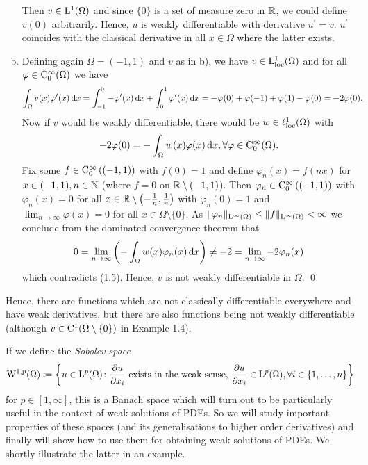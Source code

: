 \begin{ex}
\begin{enumerate}[a)]
      Then $v \in \mathrm{L}^1(\Omega)$ and since $\{0\}$ is a set of measure zero in $\mathbb{R}$, we could define $v(0)$ arbitrarily.
      Hence, $u$ is weakly differentiable with derivative $u^\prime = v$.
      $u^\prime$ coincides with the classical derivative in all $x \in \Omega$ where the latter exists.
    \item Defining again $\Omega = (-1,1)$ and $v$ as in b), we have $v \in \mathrm{L}_{\operatorname{loc}}^1(\Omega)$ and for all $\varphi \in \mathrm{C}_0^\infty(\Omega)$ we have
      \begin{align*}
      \int_\Omega v(x) \varphi^\prime(x) \, {\operatorname{d}\!{x}} 
      &= \int_{-1}^0 - \varphi^\prime(x) \, {\operatorname{d}\!{x}} + \int_0^1 \varphi^\prime(x) \, {\operatorname{d}\!{x}} 
      = - \varphi(0) + \varphi(-1) + \varphi(1) - \varphi(0) = -2\varphi(0).
      \end{align*}
      Now if $v$ would be weakly differentiable, there would be $w \in \ell_{\operatorname{loc}}^1(\Omega)$ with
      \begin{equation}
        -2\varphi(0) = -\int_\Omega w(x) \varphi(x) \, {\operatorname{d}\!{x}}, \forall \varphi \in \mathrm{C}_0^\infty(\Omega).
      \end{equation}
      Fix some $f \in \mathrm{C}_0^\infty\left((-1,1)\right)$ with $f(0) = 1$ and define $\varphi_n(x) = f(nx)$ for $x \in (-1,1), n \in \mathbb{N}$ (where $f = 0$ on $\mathbb{R} \setminus(-1,1)$).
      Then $\varphi_n \in \mathrm{C}_0^\infty\left( (-1,1)\right)$ with $\varphi_n(x) = 0$ for all $x \in \mathbb{R} \setminus\left(-\frac{1}{n}, \frac{1}{n} \right)$ with $\varphi_n(0) = 1$ and $\lim_{n \to \infty} \varphi(x) = 0$ for all $x \in \Omega \setminus \{0\}$. As $\|\varphi_n\|_{\mathrm{L}^\infty(\Omega)} \leq \|f\|_{\mathrm{L}^\infty(\Omega)} < \infty$ we conclude from the dominated convergence theorem that
      $$
      0 = \lim_{n \to \infty} \left( -\int_\Omega w(x) \varphi_n(x) \, {\operatorname{d}\!{x}} \right) \neq -2 = \lim_{n \to \infty} - 2\varphi_n(x)
      $$
      which contradicts (1.5).
      Hence, $v$ is not weakly differentiable in $\Omega$.
  \qed
  \end{enumerate}
\end{ex}

Hence, there are functions which are not classically differentiable everywhere and have weak derivatives, but there are also functions being not weakly differentiable (although $v \in  \mathrm{C}^1(\Omega\setminus\{0\})$ in Example 1.4).

If we define the \emph{Sobolev space}
$$
\mathrm{W}^{1,p}(\Omega) \coloneqq \left\{u \in \mathrm{L}^p(\Omega) \colon \frac{\partial u}{\partial x_i} \text{ exists in the weak sense, } \frac{\partial u}{\partial x_i} \in \mathrm{L}^p(\Omega), \forall i \in \{1,\dots,n\}\right\}
$$
for $p \in [1,\infty]$, this is a Banach space which will turn out to be particularly useful in the context of weak solutions of PDEs. 
So we will study important properties of these spaces (and its generalisations to higher order derivatives) and finally will show how to use them for obtaining weak solutions of PDEs.
We shortly illustrate the latter in an example.

